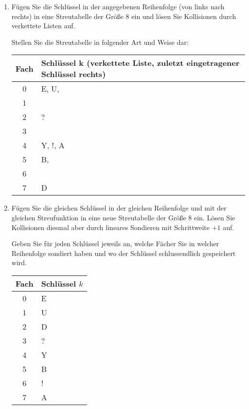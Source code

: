\documentclass{lehramt-informatik-aufgabe}
\begin{document}
\begin{enumerate}


\item Fügen Sie die Schlüssel in der angegebenen Reihenfolge (von links
nach rechts) in eine Streutabelle der Größe 8 ein und lösen Sie
Kollisionen durch verkettete Listen auf.

Stellen Sie die Streutabelle in folgender Art und Weise dar:

\begin{liAntwort}
\begin{center}
\begin{tabular}{|c||l|}
\hline
Fach & Schlüssel k {\scriptsize(verkettete Liste, zuletzt eingetragener Schlüssel rechts)}\\
\hline
0 & E, U, \\
1 & \\
2 & ? \\
3 & \\
4 & Y, !, A \\
5 & B, \\
6 & \\
7 & D\\
\hline
\end{tabular}
\end{center}
\end{liAntwort}


\item Fügen Sie die gleichen Schlüssel in der gleichen Reihenfolge und
mit der gleichen Streufunktion in eine neue Streutabelle der Größe $8$
ein. Lösen Sie Kollisionen diesmal aber durch lineares Sondieren mit
Schrittweite $+1$ auf.

Geben Sie für jeden Schlüssel jeweils an, welche Fächer Sie in welcher
Reihenfolge sondiert haben und wo der Schlüssel schlussendlich
gespeichert wird.

\begin{liAntwort}
\begin{center}
\begin{tabular}{|c||l|}
\hline
Fach & Schlüssel $k$\\
\hline
0 & E \\
1 & U \\
2 & D \\
3 & ? \\
4 & Y\\
5 & B \\
6 & !\\
7 & A \\
\hline
\end{tabular}
\end{center}


\end{liAntwort}
\end{enumerate}
\end{document}
